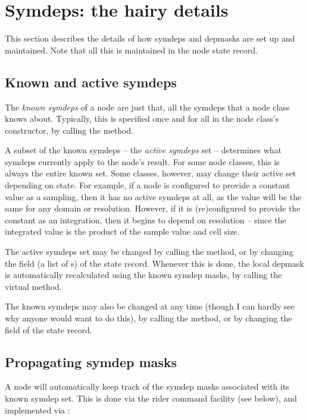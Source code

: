 \documentclass[10pt,twoside]{book}
\begin{document}
\section{Symdeps: the hairy details}

  This section describes the details of how symdeps and depmasks are set up and
  maintained. Note that all this is maintained in the node state record.

\subsection{Known and active symdeps} 
  
  The {\em known symdeps} of a node are just that, all the symdeps that a node
  class knows about. Typically, this is specified once and for all in the
  node class's constructor, by calling the  method.
  
  A subset of the known symdeps -- the {\em active symdeps} set -- determines
  what symdeps currently apply to the node's result. For some node classes,
  this is always the entire known set. Some classes, however, may change their
  active set depending on state. For example, if a  node is
  configured to provide a constant value as a sampling, then it has no active
  symdeps at all, as the value will be the same for any domain or resolution.
  However, if it is (re)configured to provide the constant as an integration,
  then it begins to depend on resolution -- since the integrated value is the
  product of the sample value and cell size.

  The active symdeps set may be changed by calling the 
  method, or by changing the  field (a list of s)
  of the state record. Whenever this is done, the local depmask is
  automatically recalculated using the known symdep masks, by calling the
  virtual  method.

  The known symdeps may also be changed at any time (though I can hardly see
  why anyone would want to do this), by calling the 
  method, or by changing the   field of the state record. 
  
\subsection{Propagating symdep masks}

  A node will automatically keep track of the symdep masks associated with its
  known symdep set. This is done via the rider command facility (see below),
  and implemented via :
\end{document}
